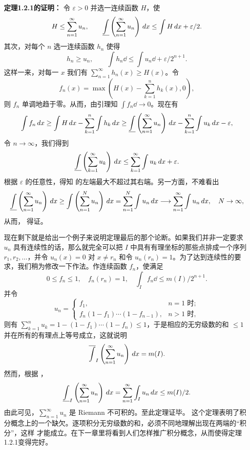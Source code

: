 \textbf{定理1.2.1的证明：} 令 $\varepsilon>0$ 并选一连续函数 $H$，使
\[H\le\sum_{n=1}^\infty u_n,\qquad\underline{\int}\left(\sum_{n=1}^\infty u_n\right)\,dx\le\int H\,dx+\varepsilon/2.\]
其次，对每个 $n$ 选一连续函数 $h_n$ 使得
\[h_n\ge u_n,\qquad\int h_n\dd\le\int u_n\dd+\varepsilon/2^{n+1}.\]
这样一来，对每一 $x$ 我们有 $\sum_{n=1}^\infty h_n(x)\ge H(x)$。令
\[f_n(x)=\max\left(H(x)-\sum_{k=1}^n h_k(x),0\right),\]
则 $f_n$ 单调地趋于零。从而，由引理知 $\int f_n\dd\to0$。现在有
\[\int f_n\,dx\ge\int H\,dx-\sum_{k=1}^n\int h_k\,dx\ge\underline{\int}\left(\sum_{n=1}^\infty u_n\right)\,dx-\sum_{k=1}^n\int u_k\,dx-\varepsilon,\]
令 $n\to\infty$，我们得到
\[\underline{\int}\left(\sum_{k=1}^\infty u_k\right)\,dx\le\sum_{k=1}^\infty\int u_k\,dx+\varepsilon.\]
根据 $\varepsilon$ 的任意性，得知  的左端最大不超过其右端。另一方面，不难看出
\[\underline{\int}\left(\sum_{n=1}^\infty u_n\right)\,dx\ge\int\left(\sum_{n=1}^N u_n\right)\,dx=\sum_{n=1}^N\int u_n\,dx\longrightarrow\sum_{n=1}^\infty\int u_n\,dx,\quad N\to\infty,\]
从而， 得证。

现在剩下就是给出一个例子来说明定理最后的那个论断。如果我们并非一定要求 $u_n$ 具有连续性的话，那么就完全可以把 $I$ 中具有有理坐标的那些点排成一个序列 $r_1,r_2,\ldots$，并令 $u_n(x)=0$ 对 $x\ne r_n$ 和令 $u_n(r_n)=1$。为了达到连续性的要求，我们稍为修改一下作法。作连续函数 $f_n$，使满足
\[0\le f_n\le1,\quad f_n(r_n)=1,\quad\int_I f_n\dd\le m(I)/2^{n+1}.\]
并令
\[u_n=\begin{cases}f_1,&n=1\text{ 时};\\f_n(1-f_1)\cdots(1-f_{n-1}),&n>1\text{ 时},\end{cases}\]
则有 $\sum_{k=1}^n u_k=1-(1-f_1)\cdots(1-f_n)\le1$，于是相应的无穷级数的和 $\le1$ 并在所有的有理点上等号成立，这就说明
\[\overline{\int}_I\left(\sum_{n=1}^\infty u_n\right)\,dx=m(I).\]
然而，根据 ，
\[\underline{\int}_I\left(\sum_{n=1}^\infty u_n\right)\,dx=\sum_{n=1}^\infty\int_I u_n\,dx\le m(I)/2.\]
由此可见，$\sum_{n=1}^\infty u_n$ 是 Riemann 不可积的。至此定理证毕。
这个定理表明了积分概念上的一个缺欠。逐项积分无穷级数的和，必须不同地理解出现在两端的“积分”，这样  才能成立。在下一章里将看到人们怎样推广积分概念，从而使得定理1.2.1变得完好。
